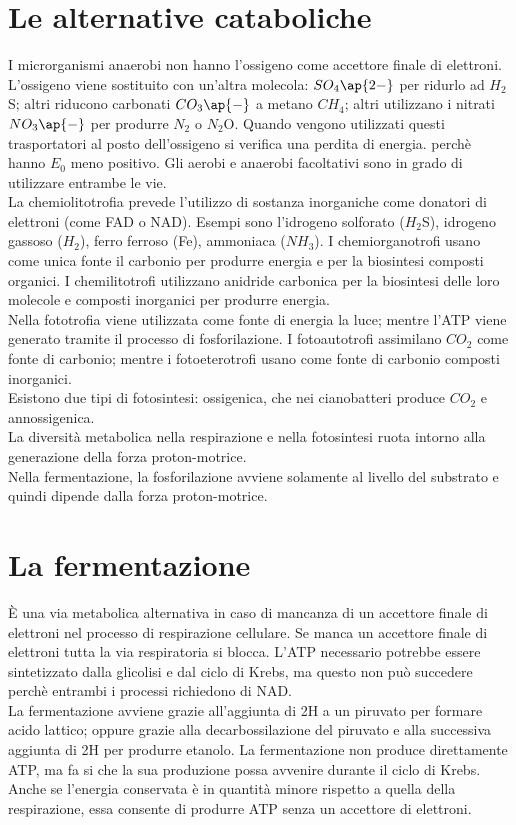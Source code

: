\section{Le alternative cataboliche}
I microrganismi anaerobi non hanno l'ossigeno come accettore finale di elettroni. L'ossigeno viene sostituito con un'altra molecola: $SO_4\ap{2-}$ per ridurlo ad $H_2$S; altri riducono carbonati $CO_3\ap{-}$ a metano $CH_4$; altri utilizzano i nitrati $NO_3\ap{-}$ per produrre $N_2$ o $N_2$O. Quando vengono utilizzati questi trasportatori al posto dell'ossigeno si verifica una perdita di energia. perch\`e hanno $E_0$ meno positivo. Gli aerobi e anaerobi facoltativi sono in grado di utilizzare entrambe le vie.
\\La chemiolitotrofia prevede l'utilizzo di sostanza inorganiche come donatori di elettroni (come FAD o NAD). Esempi sono l'idrogeno solforato ($H_2$S), idrogeno gassoso ($H_2$), ferro ferroso (Fe), ammoniaca ($NH_3$). I chemiorganotrofi usano come unica fonte il carbonio per produrre energia e per la biosintesi composti organici. I chemilitotrofi utilizzano anidride carbonica per la biosintesi delle loro molecole e composti inorganici per produrre energia. 
\\Nella fototrofia viene utilizzata come fonte di energia la luce; mentre l'ATP viene generato tramite il processo di fosforilazione. I fotoautotrofi assimilano $CO_2$ come fonte di carbonio; mentre i fotoeterotrofi usano come fonte di carbonio composti inorganici. 
\\Esistono due tipi di fotosintesi: ossigenica, che nei cianobatteri produce $CO_2$ e annossigenica.
\\La diversit\`a metabolica nella respirazione e nella fotosintesi ruota intorno alla generazione della forza proton-motrice. 
\\Nella fermentazione, la fosforilazione avviene solamente al livello del substrato e quindi dipende dalla forza proton-motrice.
\section{La fermentazione}
\`E una via metabolica alternativa in caso di mancanza di un accettore finale di elettroni nel processo di respirazione cellulare. Se manca un accettore finale di elettroni tutta la via respiratoria si blocca. L'ATP necessario potrebbe essere sintetizzato dalla glicolisi e dal ciclo di Krebs, ma questo non pu\`o succedere perch\`e entrambi i processi richiedono di NAD\ap{+}. 
\\La fermentazione avviene grazie all'aggiunta di 2H a un piruvato per formare acido lattico; oppure grazie alla decarbossilazione del piruvato e alla successiva aggiunta di 2H per produrre etanolo. La fermentazione non produce direttamente ATP, ma fa si che la sua produzione possa avvenire durante il ciclo di Krebs. Anche se l'energia conservata \`e in quantit\`a minore rispetto a quella della respirazione, essa consente di produrre ATP senza un accettore di elettroni. 
